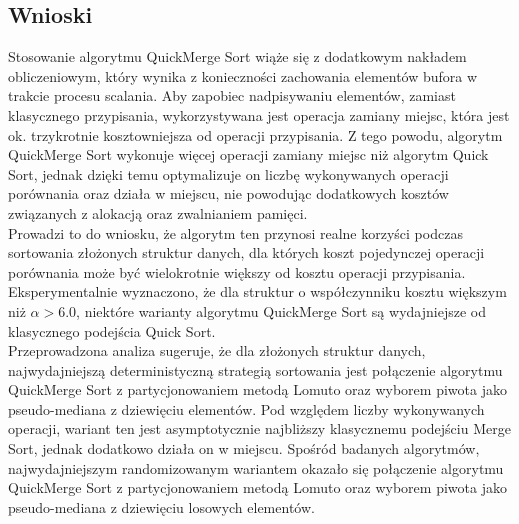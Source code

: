 \begin{figure}[]
	\centering
	
	\caption[]{}
	\label{fig:quick-merge-sort-nondeterministic-pivot-cost-factor}
\end{figure}

\subsection{Wnioski}
Stosowanie algorytmu QuickMerge Sort wiąże się z dodatkowym nakładem obliczeniowym, który wynika z konieczności zachowania elementów bufora w trakcie procesu scalania. Aby zapobiec nadpisywaniu elementów, zamiast klasycznego przypisania, wykorzystywana jest operacja zamiany miejsc, która jest ok. trzykrotnie kosztowniejsza od operacji przypisania. Z tego powodu, algorytm QuickMerge Sort wykonuje więcej operacji zamiany miejsc niż algorytm Quick Sort,
jednak dzięki temu optymalizuje on liczbę wykonywanych operacji porównania oraz działa w miejscu, nie powodując dodatkowych kosztów związanych z alokacją oraz zwalnianiem pamięci.\\

Prowadzi to do wniosku, że algorytm ten przynosi realne korzyści podczas sortowania złożonych struktur danych, dla których koszt pojedynczej operacji porównania może być wielokrotnie większy od kosztu operacji przypisania. Eksperymentalnie wyznaczono, że dla struktur o współczynniku kosztu większym niż $\alpha > 6.0$, niektóre warianty algorytmu QuickMerge Sort są wydajniejsze od klasycznego podejścia Quick Sort.\\

Przeprowadzona analiza sugeruje, że dla złożonych struktur danych, najwydajniejszą deterministyczną strategią sortowania jest połączenie algorytmu QuickMerge Sort z partycjonowaniem metodą Lomuto oraz wyborem piwota jako pseudo-mediana z dziewięciu elementów. Pod względem liczby wykonywanych operacji, wariant ten jest asymptotycznie najbliższy klasycznemu podejściu Merge Sort, jednak dodatkowo działa on w miejscu. Spośród badanych algorytmów, najwydajniejszym randomizowanym wariantem okazało się połączenie algorytmu QuickMerge Sort z partycjonowaniem metodą Lomuto oraz wyborem piwota jako pseudo-mediana z dziewięciu losowych elementów.\\